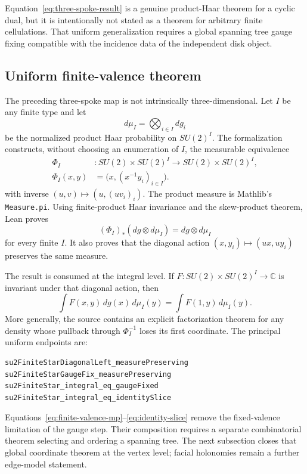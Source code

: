 \documentclass[11pt,a4paper]{article}
\theoremstyle{remark}
\begin{document}
Equation~\eqref{eq:three-spoke-result} is a genuine product-Haar theorem for a
cyclic dual, but it is intentionally not stated as a theorem for arbitrary
finite cellulations.  That uniform generalization requires a global spanning
tree gauge fixing compatible with the incidence data of the independent disk
object.

\subsection{Uniform finite-valence theorem}

The preceding three-spoke map is not intrinsically three-dimensional.  Let
$I$ be any finite type and let
\[
  d\mu_I=\bigotimes_{i\in I}dg_i
\]
be the normalized product Haar probability on $SU(2)^I$.  The formalization
constructs, without choosing an enumeration of $I$, the measurable equivalence
\[
 \begin{aligned}
 \Phi_I&\colon SU(2)\times SU(2)^I\to SU(2)\times SU(2)^I,\\
 \Phi_I(x,y)&=\bigl(x,(x^{-1}y_i)_{i\in I}\bigr).
 \end{aligned}
\]
with inverse $(u,v)\mapsto(u,(uv_i)_i)$.  The product measure is Mathlib's
\texttt{Measure.pi}.  Using finite-product Haar invariance and the skew-product
theorem, Lean proves
\begin{equation}\label{eq:finite-valence-mp}
  (\Phi_I)_*(dg\otimes d\mu_I)=dg\otimes d\mu_I
\end{equation}
for every finite $I$.  It also proves that the diagonal action
$(x,y_i)\mapsto(ux,uy_i)$ preserves the same measure.

The result is consumed at the integral level.  If
$F:SU(2)\times SU(2)^I\to\mathbb C$ is invariant under that diagonal action,
then
\begin{equation}\label{eq:identity-slice}
 \int F(x,y)\,dg(x)\,d\mu_I(y)
 =\int F(1,y)\,d\mu_I(y).
\end{equation}
More generally, the source contains an explicit factorization theorem for any
density whose pullback through $\Phi_I^{-1}$ loses its first coordinate.  The
principal uniform endpoints are:
\begin{lstlisting}
su2FiniteStarDiagonalLeft_measurePreserving
su2FiniteStarGaugeFix_measurePreserving
su2FiniteStar_integral_eq_gaugeFixed
su2FiniteStar_integral_eq_identitySlice
\end{lstlisting}

Equations~\eqref{eq:finite-valence-mp}--\eqref{eq:identity-slice} remove the
fixed-valence limitation of the gauge step.  Their composition requires a
separate combinatorial theorem selecting and ordering a spanning tree.  The
next subsection closes that global coordinate theorem at the vertex level;
facial holonomies remain a further edge-model statement.
\end{document}
